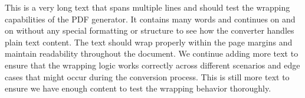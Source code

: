 \documentclass{article}
\begin{document}
This is a very long text that spans multiple lines and should test the wrapping capabilities of the PDF generator. It contains many words and continues on and on without any special formatting or structure to see how the converter handles plain text content. The text should wrap properly within the page margins and maintain readability throughout the document. We continue adding more text to ensure that the wrapping logic works correctly across different scenarios and edge cases that might occur during the conversion process. This is still more text to ensure we have enough content to test the wrapping behavior thoroughly.
\end{document}
